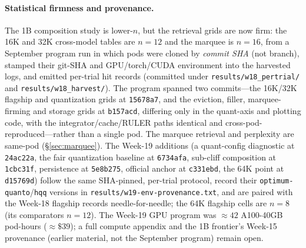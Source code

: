 \documentclass[11pt]{article}
\begin{document}
\paragraph{Statistical firmness and provenance.} The 1B composition study is
lower-$n$, but the retrieval grids are now firm: the 16K and 32K cross-model
tables are $n{=}12$ and the marquee is $n{=}16$, from a September program run in
which pods were cloned by \emph{commit SHA} (not branch), stamped their git-SHA
and GPU/torch/CUDA environment into the harvested logs, and emitted per-trial hit
records (committed under \texttt{results/w18\_pertrial/} and
\texttt{results/w18\_harvest/}). The program spanned two commits---the
16K/32K flagship and quantization grids at \texttt{15678a7}, and the eviction,
filler, marquee-firming and storage grids at \texttt{b157acd}, differing only in
the quant-axis and plotting code, with the integrator/cache/RULER paths identical
and cross-pod-reproduced---rather than a single pod. The marquee retrieval and perplexity are same-pod
(\S\ref{sec:marquee}). The Week-19 additions (a quant-config diagnostic at \texttt{24ac22a}, the fair
quantization baseline at \texttt{6734afa}, sub-cliff composition at
\texttt{1cbc31f}, persistence at \texttt{5e8b275}, official anchor at
\texttt{c331ebd}, the 64K point at \texttt{d15769d}) follow the same SHA-pinned,
per-trial protocol, record their \texttt{optimum-quanto}/\texttt{hqq} versions in
\texttt{results/w19-env-provenance.txt}, and are paired with the Week-18 flagship
records needle-for-needle; the 64K flagship cells are $n{=}8$ (its comparators
$n{=}12$). The Week-19 GPU program was $\approx42$ A100-40GB pod-hours
($\approx\$39$); a full compute appendix and the 1B frontier's Week-15 provenance
(earlier material, not the September program) remain open.
\end{document}
